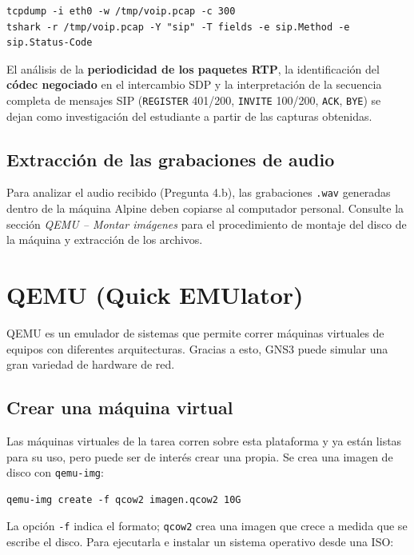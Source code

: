 \documentclass[letterpaper,12pt]{article}
\begin{document}
\begin{lstlisting}
tcpdump -i eth0 -w /tmp/voip.pcap -c 300
tshark -r /tmp/voip.pcap -Y "sip" -T fields -e sip.Method -e sip.Status-Code
\end{lstlisting}

\begin{investigar}
El análisis de la \textbf{periodicidad de los paquetes RTP}, la identificación del \textbf{códec negociado} en el intercambio SDP y la interpretación de la secuencia completa de mensajes SIP (\texttt{REGISTER} 401/200, \texttt{INVITE} 100/200, \texttt{ACK}, \texttt{BYE}) se dejan como investigación del estudiante a partir de las capturas obtenidas.
\end{investigar}

\subsection{Extracción de las grabaciones de audio}

Para analizar el audio recibido (Pregunta 4.b), las grabaciones \texttt{.wav} generadas dentro de la máquina Alpine deben copiarse al computador personal. Consulte la sección \textit{QEMU -- Montar imágenes} para el procedimiento de montaje del disco de la máquina y extracción de los archivos.

\section{QEMU (Quick EMUlator)}

QEMU es un emulador de sistemas que permite correr máquinas virtuales de equipos con diferentes arquitecturas. Gracias a esto, GNS3 puede simular una gran variedad de hardware de red.

\subsection{Crear una máquina virtual}

Las máquinas virtuales de la tarea corren sobre esta plataforma y ya están listas para su uso, pero puede ser de interés crear una propia. Se crea una imagen de disco con \texttt{qemu-img}:

\begin{lstlisting}
qemu-img create -f qcow2 imagen.qcow2 10G
\end{lstlisting}

La opción \texttt{-f} indica el formato; \texttt{qcow2} crea una imagen que crece a medida que se escribe el disco. Para ejecutarla e instalar un sistema operativo desde una ISO:
\end{document}
